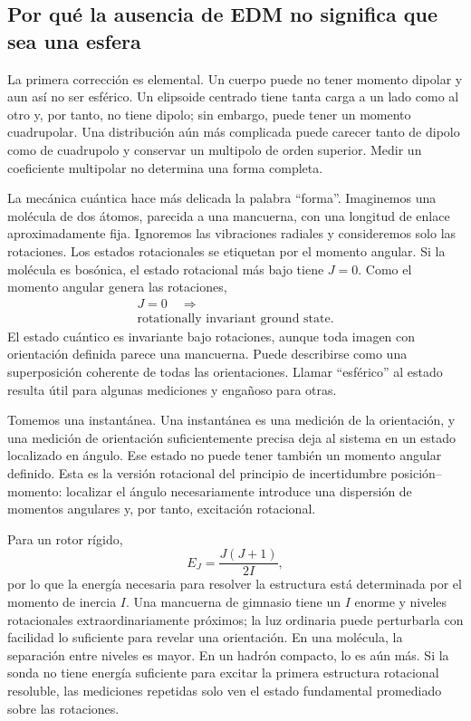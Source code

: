 \subsection{Por qué la ausencia de EDM no significa que sea una esfera}

La primera corrección es elemental. Un cuerpo puede no tener momento dipolar y aun así no ser esférico. Un elipsoide centrado tiene tanta carga a un lado como al otro y, por tanto, no tiene dipolo; sin embargo, puede tener un momento cuadrupolar. Una distribución aún más complicada puede carecer tanto de dipolo como de cuadrupolo y conservar un multipolo de orden superior. Medir un coeficiente multipolar no determina una forma completa.

La mecánica cuántica hace más delicada la palabra ``forma''. Imaginemos una molécula de dos átomos, parecida a una mancuerna, con una longitud de enlace aproximadamente fija. Ignoremos las vibraciones radiales y consideremos solo las rotaciones. Los estados rotacionales se etiquetan por el momento angular. Si la molécula es bosónica, el estado rotacional más bajo tiene \(J=0\). Como el momento angular genera las rotaciones,
\begin{equation}
\begin{gathered}
J=0 \quad\Longrightarrow\\
\text{rotationally invariant ground state.}
\end{gathered}
\end{equation}
El estado cuántico es invariante bajo rotaciones, aunque toda imagen con orientación definida parece una mancuerna. Puede describirse como una superposición coherente de todas las orientaciones. Llamar ``esférico'' al estado resulta útil para algunas mediciones y engañoso para otras.

Tomemos una instantánea. Una instantánea es una medición de la orientación, y una medición de orientación suficientemente precisa deja al sistema en un estado localizado en ángulo. Ese estado no puede tener también un momento angular definido. Esta es la versión rotacional del principio de incertidumbre posición--momento: localizar el ángulo necesariamente introduce una dispersión de momentos angulares y, por tanto, excitación rotacional.

Para un rotor rígido,
\begin{equation}
E_J=\frac{J(J+1)}{2I},
\end{equation}
por lo que la energía necesaria para resolver la estructura está determinada por el momento de inercia \(I\). Una mancuerna de gimnasio tiene un \(I\) enorme y niveles rotacionales extraordinariamente próximos; la luz ordinaria puede perturbarla con facilidad lo suficiente para revelar una orientación. En una molécula, la separación entre niveles es mayor. En un hadrón compacto, lo es aún más. Si la sonda no tiene energía suficiente para excitar la primera estructura rotacional resoluble, las mediciones repetidas solo ven el estado fundamental promediado sobre las rotaciones.

